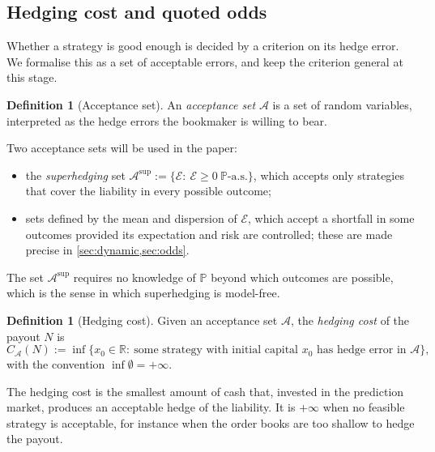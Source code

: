 \documentclass[11pt,a4paper]{article}
\theoremstyle{plain}
\theoremstyle{definition}
\newtheorem{definition}[theorem]{Definition}
\theoremstyle{remark}
\newcommand{\Prob}{\mathbb{P}}
\newcommand{\1}{\mathbf{1}}
\newcommand{\R}{\mathbb{R}}
\begin{document}
\subsection{Hedging cost and quoted odds}

Whether a strategy is good enough is decided by a criterion on its hedge error. We formalise this as a set of acceptable errors, and keep the criterion general at this stage.

\begin{definition}[Acceptance set]
\label{def:acceptance}
An \emph{acceptance set} $\mathcal{A}$ is a set of random variables, interpreted as the hedge errors the bookmaker is willing to bear.
\end{definition}

Two acceptance sets will be used in the paper:
\begin{itemize}
  \item the \emph{superhedging} set $\mathcal{A}^{\mathrm{sup}} := \{\mathcal{E}:\ \mathcal{E}\geq 0\ \Prob\text{-a.s.}\}$, which accepts only strategies that cover the liability in every possible outcome;
  \item sets defined by the mean and dispersion of $\mathcal{E}$, which accept a shortfall in some outcomes provided its expectation and risk are controlled; these are made precise in \cref{sec:dynamic,sec:odds}.
\end{itemize}
The set $\mathcal{A}^{\mathrm{sup}}$ requires no knowledge of $\Prob$ beyond which outcomes are possible, which is the sense in which superhedging is model-free.

\begin{definition}[Hedging cost]
\label{def:hedgecost}
Given an acceptance set $\mathcal{A}$, the \emph{hedging cost} of the payout $N$ is
\[
C_{\mathcal{A}}(N) := \inf\bigl\{x_0\in\R:\ \text{some strategy with initial capital } x_0 \text{ has hedge error in } \mathcal{A}\bigr\},
\]
with the convention $\inf\emptyset = +\infty$.
\end{definition}

The hedging cost is the smallest amount of cash that, invested in the prediction market, produces an acceptable hedge of the liability. It is $+\infty$ when no feasible strategy is acceptable, for instance when the order books are too shallow to hedge the payout.
\end{document}
